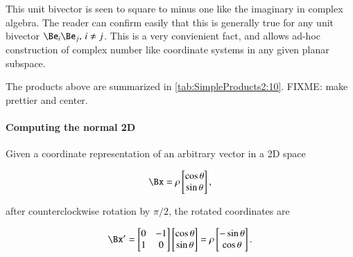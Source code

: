 This unit bivector is seen to square to minus one like the imaginary in complex algebra.  The reader can confirm easily that this is generally true for any unit bivector \( \Be_i \Be_j, \, i \ne j \).
This is a very convienient fact, and allows ad-hoc construction of complex number like coordinate systems in any given planar subspace.

The products above are summarized in \cref{tab:SimpleProducts2:10}.
FIXME: make prettier and center.


\paragraph{Computing the normal 2D}

Given a coordinate representation of an arbitrary vector in a 2D space

\begin{dmath}\label{eqn:SimpleProducts2:240}
   \Bx = \rho
\begin{bmatrix}
   \cos\theta \\
   \sin\theta \\
\end{bmatrix},
\end{dmath}

after counterclockwise rotation by \( \pi/2 \), the rotated coordinates are

\begin{dmath}\label{eqn:SimpleProducts2:260}
\Bx'
=
\begin{bmatrix}
   0 & -1 \\
   1 & 0 \\
\end{bmatrix}
\begin{bmatrix}
   \cos\theta \\
   \sin\theta \\
\end{bmatrix}
=
\rho
\begin{bmatrix}
   -\sin\theta \\
   \cos\theta
\end{bmatrix}.
\end{dmath}

